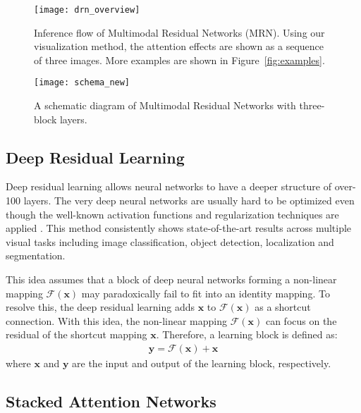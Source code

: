 \documentclass{article}
\newcommand{\vx}[0]{\mathbf{x}}
\newcommand{\vy}[0]{\mathbf{y}}
\begin{document}
\begin{figure}[t]
\centering
\begin{minipage}{.55\textwidth}
  \centering
  \texttt{[image: drn\_overview]}
  \caption{Inference flow of Multimodal Residual Networks (MRN). Using our visualization method, the attention effects are shown as a sequence of three images. More examples are shown in Figure~\ref{fig:examples}.}
  \label{fig:overview}
\end{minipage}
\hspace{26pt}
\begin{minipage}{.36\textwidth}
  \centering
  \texttt{[image: schema\_new]}
  \caption{A schematic diagram of Multimodal Residual Networks with three-block layers.}
  \label{fig:schema}
\end{minipage}
\end{figure}

\subsection{Deep Residual Learning}

Deep residual learning \cite{He2015} allows neural networks to have a deeper structure of over-100 layers. The very deep neural networks are usually hard to be optimized even though the well-known activation functions and regularization techniques are applied \cite{Nair2010,Hinton2012,Szegedy2015}. This method consistently shows state-of-the-art results across multiple visual tasks including image classification, object detection, localization and segmentation.

This idea assumes that a block of deep neural networks forming a non-linear mapping $\mathcal{F}(\vx)$ may paradoxically fail to fit into an identity mapping. To resolve this, the deep residual learning adds $\vx$ to $\mathcal{F}(\vx)$ as a shortcut connection. With this idea, the non-linear mapping $\mathcal{F}(\vx)$ can focus on the residual of the shortcut mapping $\vx$. Therefore, a learning block is defined as: \begin{align}
  \vy = \mathcal{F}(\vx) + \vx
\end{align}
where $\vx$ and $\vy$ are the input and output of the learning block, respectively.

\subsection{Stacked Attention Networks}
\end{document}
